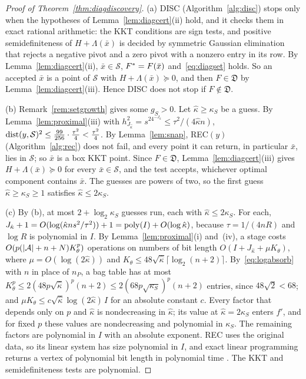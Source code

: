 \begin{proof}[Proof of Theorem~\ref{thm:diagdiscovery}]
(a) DISC (Algorithm~\ref{alg:disc}) stops only when the hypotheses of
Lemma~\ref{lem:diagcert}(ii) hold, and it checks them in exact rational
arithmetic: the KKT conditions are sign tests, and positive semidefiniteness of $H+\Lambda(\bar x)$ is
decided by symmetric Gaussian elimination that rejects a negative pivot and
a zero pivot with a nonzero entry in its row. By
Lemma~\ref{lem:diagcert}(ii), $\bar x\in\mathcal S$, $F^{*}=F(\bar x)$
and~\eqref{eq:diagset} holds. So an accepted $\bar x$ is a point of
$\mathcal S$ with $H+\Lambda(\bar x)\succeq0$, and then $F\in\mathfrak D$
by Lemma~\ref{lem:diagcert}(iii). Hence DISC does not stop if
$F\notin\mathfrak D$.

(b) Remark~\ref{rem:setgrowth} gives some $g_S>0$. Let $\hat\kappa\ge\kappa_S$
be a guess. By Lemma~\ref{lem:proximal}(iii) with $h_{J_{\hat\kappa}}^2
=s^24^{-J_{\hat\kappa}}\le\tau^2/(4\hat\kappa n)$,
$\operatorname{dist}(y,\mathcal S)^2\le\frac{99}{256}\cdot\frac{\tau^2}4<\frac{\tau^2}4$. By
Lemma~\ref{lem:snap}, REC$(y)$ (Algorithm~\ref{alg:rec}) does not fail, and
every point it can return, in particular $\bar x$, lies in $\mathcal S$; so $\bar x$ is a box KKT point.
Since $F\in\mathfrak D$, Lemma~\ref{lem:diagcert}(iii) gives
$H+\Lambda(\bar x)\succeq0$ for every $\bar x\in\mathcal S$, and the test
accepts, whichever optimal component contains $\bar x$. The guesses are
powers of two, so the first guess $\hat\kappa\ge\kappa_S\ge1$ satisfies
$\hat\kappa\le2\kappa_S$.

(c) By (b), at most $2+\log_2\kappa_S$ guesses run, each with
$\hat\kappa\le2\kappa_S$. For each,
$J_{\hat\kappa}+1=O(\log(\hat\kappa ns^2/\tau^2))+1=\operatorname{poly}(I)+O(\log\hat\kappa)$,
because $\tau=1/(4nR)$ and $\log R$ is polynomial in $I$. By
Lemma~\ref{lem:proximal}(i) and~(iv), a stage costs
$O(p(\lvert \mathcal A\rvert+n+N)K_\theta^p)$ operations on numbers of bit length
$O(I+J_{\hat\kappa}+\mu K_\theta)$, where $\mu=O(\log(2\hat\kappa))$ and
$K_\theta\le48\sqrt{\hat\kappa}\lceil\log_2(n+2)\rceil$. By~\eqref{eq:logabsorb}
with $n$ in place of $n_P$, a bag table has at most
$K_\theta^p\le2(48p\sqrt{\hat\kappa})^p(n+2)\le2(68p\sqrt{\kappa_S})^p(n+2)$
entries, since $48\sqrt2<68$; and
$\mu K_\theta\le c\sqrt{\hat\kappa}\log(2\hat\kappa)\,I$ for an absolute
constant $c$. Every factor that depends only on $p$ and $\hat\kappa$ is
nondecreasing in $\hat\kappa$; its value at $\hat\kappa=2\kappa_S$ enters
$f'$, and for fixed $p$ these values are nondecreasing and polynomial in
$\kappa_S$. The remaining factors are polynomial in $I$ with an absolute
exponent. REC uses the original data, so its linear system has size
polynomial in $I$, and exact linear programming returns a vertex of
polynomial bit length in polynomial time
\cite[Theorem~6.4.12]{GrotschelLovaszSchrijver1988}. The KKT and
semidefiniteness tests are polynomial.
\end{proof}

